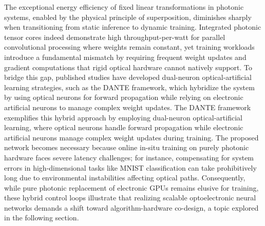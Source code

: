 The exceptional energy efficiency of fixed linear transformations in photonic systems, enabled by the physical principle of superposition, diminishes sharply when transitioning from static inference to dynamic training. Integrated photonic tensor cores indeed demonstrate high throughput-per-watt for parallel convolutional processing where weights remain constant, yet training workloads introduce a fundamental mismatch by requiring frequent weight updates and gradient computations that rigid optical hardware cannot natively support. To bridge this gap, published studies have developed dual-neuron optical-artificial learning strategies, such as the DANTE framework, which hybridize the system by using optical neurons for forward propagation while relying on electronic artificial neurons to manage complex weight updates. The DANTE framework exemplifies this hybrid approach by employing dual-neuron optical-artificial learning, where optical neurons handle forward propagation while electronic artificial neurons manage complex weight updates during training. \citep{doi_10_1038_s41467_023_42984_y_7fc109e3} The proposed network becomes necessary because online in-situ training on purely photonic hardware faces severe latency challenges; for instance, compensating for system errors in high-dimensional tasks like MNIST classification can take prohibitively long due to environmental instabilities affecting optical paths. Consequently, while pure photonic replacement of electronic GPUs remains elusive for training, these hybrid control loops illustrate that realizing scalable optoelectronic neural networks demands a shift toward algorithm-hardware co-design, a topic explored in the following section. \citep{doi_10_1515_nanoph_2022_0423_38a2c3ec} \citep{doi_10_1038_s41467_023_42984_y_7fc109e3} \citep{doi_10_1038_s41467_022_35772_7_90150ade}

